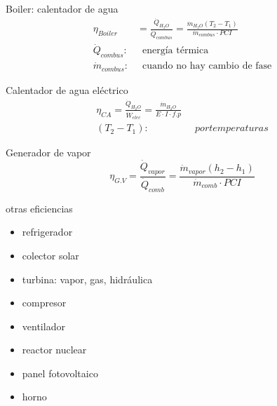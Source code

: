 Boiler: calentador de agua
\[
    \begin{split}
        \eta_{Boiler} & = \frac{ \dot{Q}_{H_{2}O} }{ \dot{Q}_{combus} } = \frac{ \dot{m}_{H_{2}O} (T_{2} - T_{1} ) }{ \dot{m}_{combus} \cdot PCI } \\
        \dot{Q}_{combus} : & \;\; \text{energía térmica} \\
        \dot{m}_{combus} : & \;\; \text{cuando no hay cambio de fase}
    \end{split}
\]

Calentador de agua eléctrico 
\[
    \begin{split}
        \eta_{CA} = \frac{ \dot{Q}_{H_{2}O} }{ \dot{W}_{elec} } = \frac{ \dot{m}_{ H_{2}O } }{ E \cdot I \cdot f.p } \\
        (T_{2} - T_{1}): & \;\; por temperaturas
    \end{split}
\]

Generador de vapor
\[
        \eta_{G.V} = \frac{ \dot{Q}_{vapor} }{ \dot{Q}_{comb} } = \frac{ \dot{m}_{vapor} (h_{2} - h_{1}) }{ \dot{m}_{comb} \cdot PCI }
\]

otras eficiencias

\begin{itemize}
    \item refrigerador 
    \item colector solar
    \item turbina: vapor, gas, hidráulica
    \item compresor 
    \item ventilador
    \item reactor nuclear 
    \item panel fotovoltaico
    \item horno
\end{itemize}